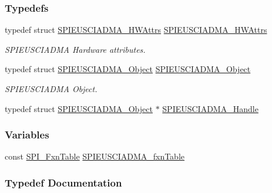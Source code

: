 \subsubsection*{Typedefs}
\begin{DoxyCompactItemize}
\item 
typedef struct \hyperlink{struct_s_p_i_e_u_s_c_i_a_d_m_a___h_w_attrs}{S\+P\+I\+E\+U\+S\+C\+I\+A\+D\+M\+A\+\_\+\+H\+W\+Attrs} \hyperlink{_s_p_i_e_u_s_c_i_a_d_m_a_8h_a6568ba84990eb85b7857fad2ad8b7287}{S\+P\+I\+E\+U\+S\+C\+I\+A\+D\+M\+A\+\_\+\+H\+W\+Attrs}
\begin{DoxyCompactList}\small\item\em S\+P\+I\+E\+U\+S\+C\+I\+A\+D\+M\+A Hardware attributes. \end{DoxyCompactList}\item 
typedef struct \hyperlink{struct_s_p_i_e_u_s_c_i_a_d_m_a___object}{S\+P\+I\+E\+U\+S\+C\+I\+A\+D\+M\+A\+\_\+\+Object} \hyperlink{_s_p_i_e_u_s_c_i_a_d_m_a_8h_a4126d5130238bf5228a4b403e75108e7}{S\+P\+I\+E\+U\+S\+C\+I\+A\+D\+M\+A\+\_\+\+Object}
\begin{DoxyCompactList}\small\item\em S\+P\+I\+E\+U\+S\+C\+I\+A\+D\+M\+A Object. \end{DoxyCompactList}\item 
typedef struct \hyperlink{struct_s_p_i_e_u_s_c_i_a_d_m_a___object}{S\+P\+I\+E\+U\+S\+C\+I\+A\+D\+M\+A\+\_\+\+Object} $\ast$ \hyperlink{_s_p_i_e_u_s_c_i_a_d_m_a_8h_a16164ef02768c9a61448d6c0f4d27b29}{S\+P\+I\+E\+U\+S\+C\+I\+A\+D\+M\+A\+\_\+\+Handle}
\end{DoxyCompactItemize}
\subsubsection*{Variables}
\begin{DoxyCompactItemize}
\item 
const \hyperlink{struct_s_p_i___fxn_table}{S\+P\+I\+\_\+\+Fxn\+Table} \hyperlink{_s_p_i_e_u_s_c_i_a_d_m_a_8h_aa7972f6d4283ec2939eb929510b33fa8}{S\+P\+I\+E\+U\+S\+C\+I\+A\+D\+M\+A\+\_\+fxn\+Table}
\end{DoxyCompactItemize}


\subsubsection{Typedef Documentation}
